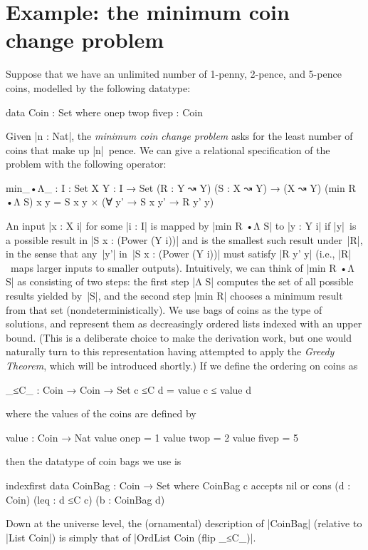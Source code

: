 \section{Example: the minimum coin change problem}
\label{sec:minimum-coin-change}

Suppose that we have an unlimited number of 1-penny, 2-pence, and 5-pence coins, modelled by the following datatype:
\begin{code}
data Coin : Set where
  onep twop fivep : Coin
\end{code}
Given |n : Nat|, the \emph{minimum coin change problem} asks for the least number of coins that make up |n|~pence.
We can give a relational specification of the problem with the following operator:
\begin{code}
min_•Λ_ :  {I : Set} {X Y : I → Set}
           (R : Y ↝ Y) (S : X ↝ Y) → (X ↝ Y)
(min R •Λ S) x y = S x y × (∀ y' → S x y' → R y' y)
\end{code}
An input |x : X i| for some |i : I| is mapped by |min R •Λ S| to |y : Y i| if |y|~is a possible result in |S x : (Power (Y i))| and is the smallest such result under~|R|, in the sense that any~|y'| in~|S x : (Power (Y i))| must satisfy |R y' y| (i.e., |R|~maps larger inputs to smaller outputs).
Intuitively, we can think of |min R •Λ S| as consisting of two steps: the first step |Λ S| computes the set of all possible results yielded by~|S|, and the second step |min R| chooses a minimum result from that set (nondeterministically).
We use bags of coins as the type of solutions, and represent them as decreasingly ordered lists indexed with an upper bound.
(This is a deliberate choice to make the derivation work, but one would naturally turn to this representation having attempted to apply the \emph{Greedy Theorem}, which will be introduced shortly.)
If we define the ordering on coins as
\begin{code}
_≤C_ : Coin → Coin → Set
c ≤C d = value c ≤ value d
\end{code}
where the values of the coins are defined by
\begin{code}
value : Coin → Nat
value  onep   =  1
value  twop   =  2
value  fivep  =  5
\end{code}
then the datatype of coin bags we use is
\begin{code}
indexfirst data CoinBag : Coin → Set where
  CoinBag c  accepts  nil
             or       cons  (d : Coin) (leq : d ≤C c) (b : CoinBag d)
\end{code}
Down at the universe level, the (ornamental) description of |CoinBag| (relative to |List Coin|) is simply that of |OrdList Coin (flip _≤C_)|.
